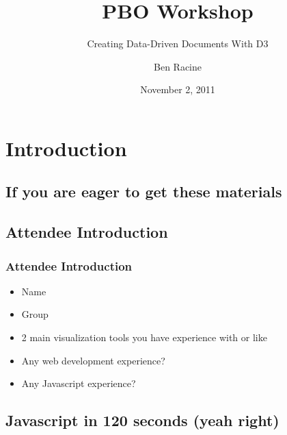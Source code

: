\documentclass{beamer}
\title{PBO Workshop}
\subtitle{Creating Data-Driven Documents With D3}
\author{Ben Racine \inst{1} }
\institute{\inst{1} Cornerstone Systems NW }
\date{November 2, 2011}
\begin{document}
\begin{frame}
    \frametitle{}
    \titlepage
\end{frame}






\section{Introduction}


\subsection{If you are eager to get these materials}




\subsection{Attendee Introduction}


\begin{frame}
    \frametitle{Attendee Introduction}
    \begin{itemize}
\pause
    \item Name
    \item Group
    \item 2 main visualization tools you have experience with or like
    \item Any web development experience?
    \item Any Javascript experience?
    \end{itemize}
\end{frame}



\subsection{Javascript in 120 seconds (yeah right)}
\end{document}
